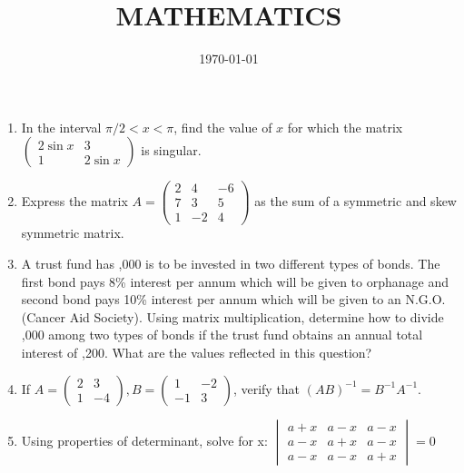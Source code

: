 \documentclass[10pt,-letter paper]{article}
\title{MATHEMATICS}
\date{\today}
\newcommand{\myvec}[1]{\ensuremath{\begin{pmatrix}#1\end{pmatrix}}}
\newcommand{\mydet}[1]{\ensuremath{\begin{vmatrix}#1\end{vmatrix}}}
\begin{document}
\maketitle

\begin{enumerate}
\section{Matrices}
\item In the interval ${\pi}/2<x<\pi$, find the value of $x$ for which the matrix $\myvec{2\sin{x} & 3 \\ 1 & 2\sin{x}}$ is singular.\\
\item Express the matrix $A = \myvec{2&4&-6\\7&3&5\\1&-2&4}$ as the sum of a symmetric and skew symmetric matrix. \\
\item A trust fund has ,000 is to be invested in two different types of bonds. The first bond pays 8\% interest per annum which will be given to orphanage and second bond pays 10\% interest per annum which will be given to an N.G.O. (Cancer Aid Society). Using matrix multiplication, determine how to divide ,000 among two types of bonds if the trust fund obtains an annual total interest of ,200. What are the values reflected in this question? \\
\item If $A = \myvec{2&3\\1&-4}, B = \myvec{1&-2\\-1&3}$, verify that $(AB)^{-1} = B^{-1}A^{-1}$. \\
\item Using properties of determinant, solve for x:
$\mydet{a+x & a-x & a-x \\ a-x & a+x & a-x \\ a-x & a-x & a+x} = 0$ \\

\end{enumerate}
\end{document}
